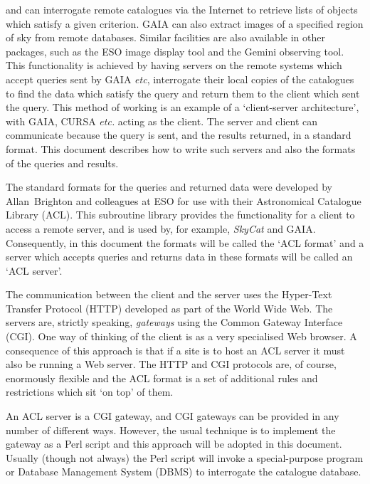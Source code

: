 \documentclass[twoside,11pt,nolof,chapters]{starlink}
\begin{document}
\cite{SUN214} and \cite{SUN190}
can interrogate remote catalogues via the Internet to retrieve lists of
objects which satisfy a given criterion.  GAIA can also extract images
of a specified region of sky from remote databases.  Similar facilities
are also available in other packages, such as the ESO
image display tool and the Gemini observing tool.  This functionality
is achieved by having servers on the remote systems which accept queries
sent by GAIA \emph{etc}, interrogate their local copies of the catalogues
to find the data which satisfy the query and return them to the client
which sent the query.  This method of working is an example of a
`client-server architecture', with GAIA, CURSA \emph{etc.} acting as the
client.  The server and client can communicate because the query is sent,
and the results returned, in a standard format.  This document describes
how to write such servers and also the formats of the queries and results.

The standard formats for the queries and returned data were developed by
Allan~Brighton and colleagues at ESO for use with their Astronomical
Catalogue Library (ACL).  This subroutine library provides the
functionality for a client to access a remote server, and is used by,
for example, \textit{SkyCat}\/ and GAIA.  Consequently, in this document
the formats will be called the `ACL format' and a server which accepts
queries and returns data in these formats will be called an `ACL server'.

The communication between the client and the server uses the Hyper-Text
Transfer Protocol (HTTP)  developed as part of the World Wide Web.  The
servers are, strictly speaking, \textit{gateways}\/ using the Common Gateway
Interface (CGI).  One way of thinking of the client is as a very
specialised Web browser.  A consequence of this approach is that if a
site is to host an ACL server it must also be running a Web server.  The
HTTP and CGI protocols are, of course, enormously flexible and the
ACL format is a set of additional rules and restrictions which sit `on
top' of them.

An ACL server is a CGI gateway, and CGI gateways can be provided in any
number of different ways.  However, the usual technique is to implement
the gateway as a Perl script and this approach will be adopted in this
document.  Usually (though not always) the Perl script will invoke a
special-purpose program or Database Management System (DBMS) to
interrogate the catalogue database.
\end{document}
